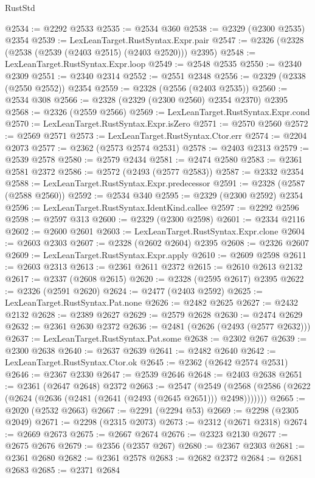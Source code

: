 \begin{lexlean}{RustStd}
\begin{coremodule}
@2534 := @2292 @2533
@2535 := @2534 @360
@2538 := @2329 (@2300 @2535) @2354
@2539 := LexLeanTarget.RustSyntax.Expr.pair
@2547 := @2326 (@2328 (@2538 (@2539 (@2403 @2515) (@2403 @2520))) @2395)
@2548 := LexLeanTarget.RustSyntax.Expr.loop
@2549 := @2548 @2535
@2550 := @2340 @2309
@2551 := @2340 @2314
@2552 := @2551 @2348
@2556 := @2329 (@2338 (@2550 @2552)) @2354
@2559 := @2328 (@2556 (@2403 @2535))
@2560 := @2534 @308
@2566 := @2328 (@2329 (@2300 @2560) @2354 @2370) @2395
@2568 := @2326 (@2559 @2566)
@2569 := LexLeanTarget.RustSyntax.Expr.cond
@2570 := LexLeanTarget.RustSyntax.Expr.isZero
@2571 := @2570 @2560
@2572 := @2569 @2571
@2573 := LexLeanTarget.RustSyntax.Ctor.err
@2574 := @2204 @2073
@2577 := @2362 (@2573 @2574 @2531)
@2578 := @2403 @2313
@2579 := @2539 @2578
@2580 := @2579 @2434
@2581 := @2474 @2580
@2583 := @2361 @2581 @2372
@2586 := @2572 (@2493 (@2577 @2583))
@2587 := @2332 @2354
@2588 := LexLeanTarget.RustSyntax.Expr.predecessor
@2591 := @2328 (@2587 (@2588 @2560))
@2592 := @2534 @340
@2595 := @2329 (@2300 @2592) @2354
@2596 := LexLeanTarget.RustSyntax.IdentKind.callee
@2597 := @2292 @2596
@2598 := @2597 @313
@2600 := @2329 (@2300 @2598)
@2601 := @2334 @2116
@2602 := @2600 @2601
@2603 := LexLeanTarget.RustSyntax.Expr.clone
@2604 := @2603 @2303
@2607 := @2328 (@2602 @2604) @2395
@2608 := @2326 @2607
@2609 := LexLeanTarget.RustSyntax.Expr.apply
@2610 := @2609 @2598
@2611 := @2603 @2313
@2613 := @2361 @2611 @2372
@2615 := @2610 @2613 @2132
@2617 := @2337 (@2608 @2615)
@2620 := @2328 (@2595 @2617) @2395
@2622 := @2326 (@2591 @2620)
@2624 := @2477 (@2403 @2592)
@2625 := LexLeanTarget.RustSyntax.Pat.none
@2626 := @2482 @2625
@2627 := @2432 @2132
@2628 := @2389 @2627
@2629 := @2579 @2628
@2630 := @2474 @2629
@2632 := @2361 @2630 @2372
@2636 := @2481 (@2626 (@2493 (@2577 @2632)))
@2637 := LexLeanTarget.RustSyntax.Pat.some
@2638 := @2302 @267
@2639 := @2300 @2638
@2640 := @2637 @2639
@2641 := @2482 @2640
@2642 := LexLeanTarget.RustSyntax.Ctor.ok
@2645 := @2362 (@2642 @2574 @2531)
@2646 := @2367 @2330
@2647 := @2539 @2646
@2648 := @2403 @2638
@2651 := @2361 (@2647 @2648) @2372
@2663 := @2547
    (@2549 (@2568 (@2586 (@2622 (@2624 (@2636 (@2481 (@2641 (@2493 (@2645 @2651))) @2498)))))))
@2665 := @2020 (@2532 @2663)
@2667 := @2291 (@2294 @53)
@2669 := @2298 (@2305 @2049)
@2671 := @2298 (@2315 @2073)
@2673 := @2312 (@2671 @2318)
@2674 := @2669 @2673
@2675 := @2667 @2674
@2676 := @2323 @2130
@2677 := @2675 @2676
@2679 := @2356 (@2357 @267)
@2680 := @2367 @2303
@2681 := @2361 @2680
@2682 := @2361 @2578
@2683 := @2682 @2372
@2684 := @2681 @2683
@2685 := @2371 @2684

\end{coremodule}
\end{lexlean}
